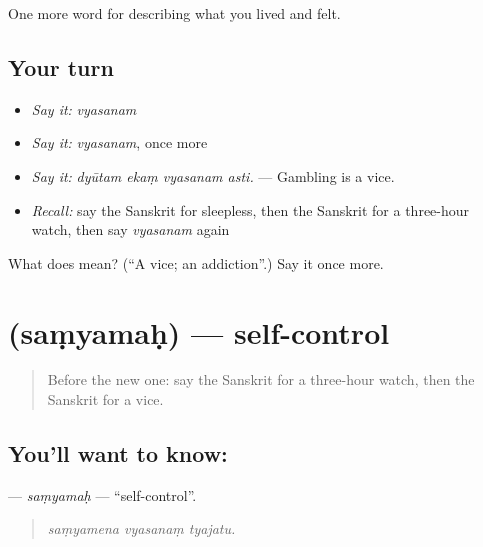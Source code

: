 \begin{grammarlens}[title={What you've built}]
One more word for describing what you lived and felt.
\end{grammarlens}

\subsection*{Your turn}
\begin{itemize}
\raggedright
  \item \emph{Say it:} \emph{vyasanam}
  \item \emph{Say it:} \emph{vyasanam}, once more
  \item \emph{Say it:} \emph{dyūtam ekaṃ vyasanam asti.} — Gambling is a vice.
  \item \emph{Recall:} say the Sanskrit for sleepless, then the Sanskrit for a three-hour watch, then say \emph{vyasanam} again
\end{itemize}

\begin{tcolorbox}[breakable,colback=teal!4,colframe=teal!35!black,title={Before you move on}]
What does  mean? (\textquotedblleft{}A vice; an addiction\textquotedblright{}.) Say it once more.
\end{tcolorbox}
\section[\texorpdfstring{\sk{संयमः} (saṃyamaḥ)}{संयमः (saṃyamaḥ)}]{ (saṃyamaḥ) — self-control}

\label{lesson:SA-C489-samyamah}



\begin{quote}
Before the new one: say the Sanskrit for a three-hour watch, then the Sanskrit for a vice.
\end{quote}

\subsection*{You'll want to know: }
\textbf{} — \emph{saṃyamaḥ} — \textquotedblleft{}self-control\textquotedblright{}.

\begin{quote}
  
\end{quote}

\begin{quote}
\emph{saṃyamena vyasanaṃ tyajatu.}
\end{quote}

